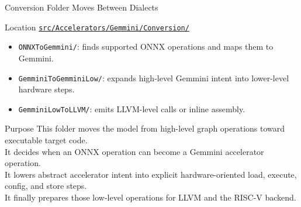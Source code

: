 \documentclass[aspectratio=169,10pt]{beamer}
\newcommand{\code}[1]{\texttt{\footnotesize #1}}
\newcommand{\repoRoot}{/home/lahcen/toolchains/onnx-mlir-xcompile/onnx-mlir}
\newcommand{\pathcode}[1]{\href{run:\repoRoot/#1}{\texttt{\scriptsize #1}}}
\begin{document}
\begin{frame}{Conversion Folder Moves Between Dialects}
  \begin{block}{Location}
    \pathcode{src/Accelerators/Gemmini/Conversion/}
  \end{block}
  \begin{itemize}
    \item \code{ONNXToGemmini/}: finds supported ONNX operations and maps them to Gemmini.
    \item \code{GemminiToGemminiLow/}: expands high-level Gemmini intent into lower-level hardware steps.
    \item \code{GemminiLowToLLVM/}: emits LLVM-level calls or inline assembly.
  \end{itemize}
  \begin{block}{Purpose}
    This folder moves the model from high-level graph operations toward executable target code.\\
    It decides when an ONNX operation can become a Gemmini accelerator operation.\\
    It lowers abstract accelerator intent into explicit hardware-oriented load, execute, config, and store steps.\\
    It finally prepares those low-level operations for LLVM and the RISC-V backend.
  \end{block}
\end{frame}
\end{document}
